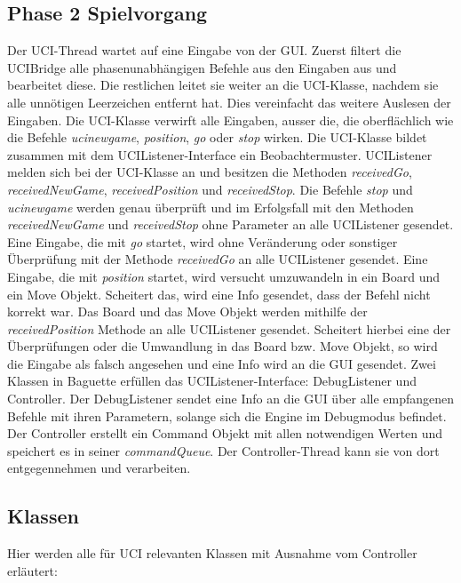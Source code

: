 \subsection{Phase 2 Spielvorgang}\label{subsec:phase-2-spielvorgang}
Der UCI-Thread wartet auf eine Eingabe von der GUI\@.
Zuerst filtert die UCIBridge alle phasenunabh\"angigen Befehle aus den Eingaben aus und bearbeitet diese.
Die restlichen leitet sie weiter an die UCI-Klasse, nachdem sie alle unn\"otigen Leerzeichen entfernt hat.
Dies vereinfacht das weitere Auslesen der Eingaben.
Die UCI-Klasse verwirft alle Eingaben, ausser die, die oberfl\"achlich wie die Befehle \textit{ucinewgame}, \textit{position},
\textit{go} oder \textit{stop} wirken.
\newline
Die UCI-Klasse bildet zusammen mit dem UCIListener-Interface ein Beobachtermuster.
UCIListener melden sich bei der UCI-Klasse an und besitzen die Methoden \textit{receivedGo}, \textit{receivedNewGame},
\textit{receivedPosition} und \textit{receivedStop}.
\newline
Die Befehle \textit{stop} und \textit{ucinewgame} werden genau \"uberpr\"uft und im Erfolgsfall mit den Methoden
\textit{receivedNewGame} und \textit{receivedStop} ohne Parameter an alle UCIListener gesendet.
Eine Eingabe, die mit \textit{go} startet, wird ohne Ver\"anderung oder sonstiger \"Uberpr\"ufung mit der Methode
\textit{receivedGo} an alle UCIListener gesendet.
Eine Eingabe, die mit \textit{position} startet, wird versucht umzuwandeln in ein Board und ein Move
Objekt.
Scheitert das, wird eine Info gesendet, dass der Befehl nicht korrekt war.
Das Board und das Move Objekt werden mithilfe der \textit{receivedPosition} Methode an alle UCIListener
gesendet.
\newline
Scheitert hierbei eine der \"Uberpr\"ufungen oder die Umwandlung in das Board bzw. Move Objekt,
so wird die Eingabe als falsch angesehen und eine Info wird an die GUI gesendet.
\newline
Zwei Klassen in Baguette erf\"ullen das UCIListener-Interface: DebugListener und Controller.
Der DebugListener sendet eine Info an die GUI \"uber alle empfangenen Befehle mit ihren Parametern, solange sich die
Engine im Debugmodus befindet.
\newline
Der Controller erstellt ein Command Objekt mit allen notwendigen Werten und speichert es in seiner
\textit{commandQueue}.
Der Controller-Thread kann sie von dort entgegennehmen und verarbeiten.
\newline \newline
\subsection{Klassen}\label{subsec:klassen}
Hier werden alle f\"ur UCI relevanten Klassen mit Ausnahme vom Controller erl\"autert:
